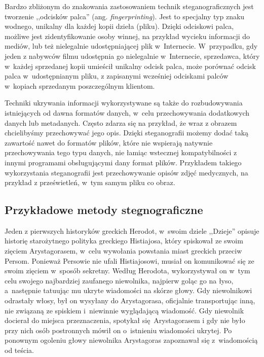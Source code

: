 \documentclass[a4paper, twoside, openright, 12pt]{report}
\begin{document}
        Bardzo zbliżonym do znakowania zastosowaniem technik steganograficznych jest
        tworzenie ,,odcisków palca'' (ang. \emph{fingerprinting}). Jest to specjalny
        typ znaku wodnego, unikalny dla każdej kopii dzieła (pliku). Dzięki odciskowi
        palca, możliwe jest zidentyfikowanie osoby winnej, na przykład wycieku informacji
        do mediów, lub też nielegalnie udostępniającej plik w~Internecie. W~przypadku,
        gdy jeden z nabywców filmu udostępnia go nielegalnie w~Internecie, sprzedawca,
        który w~każdej sprzedanej kopii umieścił unikalny odcisk palca, może porównać
        odcisk palca w~udostępnianym pliku, z zapisanymi wcześniej odciskami palców
        w~kopiach sprzedanym poszczególnym klientom.

        Techniki ukrywania informacji wykorzystywane są także do rozbudowywania
        istniejących od dawna formatów danych, w~celu przechowywania dodatkowych
        danych lub metadanych. Często zdarza się na przykład, że wraz z obrazem
        chcielibyśmy przechowywać jego opis. Dzięki steganografii możemy dodać
        taką zawartość nawet do formatów plików, które nie wspierają natywnie
        przechowywania tego typu danych, nie łamiąc wstecznej kompatybilności z innymi
        programami obsługującymi dany format plików. Przykładem takiego wykorzystania
        steganografii jest przechowywanie opisów zdjęć medycznych, na przykład
        z prześwietleń, w~tym samym pliku co obraz\cite{DISAPPEARINGCRYPTOEMBEDDINGMETDATA}.

        \subsection{Przykładowe metody stegnograficzne}
        Jeden z pierwszych historyków greckich Herodot, w~swoim dziele ,,Dzieje''
        opisuje historię starożytnego polityka greckiego Histiajosa, który spiskował
        ze swoim zięciem Arystagorasem, w~celu wywołania powstania miast greckich
        przeciw Persom\cite{STEGANOGRAPHYINTRO}. Ponieważ Persowie nie ufali Histiajosowi, musiał on komunikować
        się ze swoim zięciem w~sposób sekretny. Według Herodota, wykorzystywał
        on w~tym celu swojego najbardziej zaufanego niewolnika, najpierw goląc
        go na łyso, a~następnie tatuując mu ukryte wiadomości na skórze głowy.
        Gdy niewolnikowi odrastały włosy, był on wysyłany do Arystagorasa, oficjalnie
        transportując inną, nie związaną ze spiskiem i~niewinnie wyglądającą wiadomość.
        Gdy niewolnik docierał do miejsca przeznaczenia, spotykał się Arystagorasem i
        gdy nie było przy nich osób postronnych mówił on o~istnieniu wiadomości ukrytej.
        Po ponownym ogoleniu głowy niewolnika Arystagoras zapoznawał się z~wiadomością
        od teścia.
\end{document}
